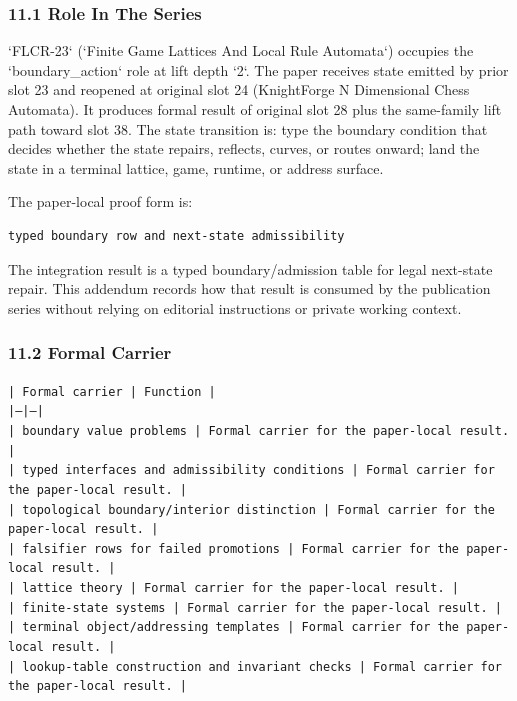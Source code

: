 \documentclass[11pt]{article}
\begin{document}
\subsubsection*{11.1 Role In The Series}

`FLCR-23` (`Finite Game Lattices And Local Rule Automata`) occupies the `boundary\_action` role at lift depth `2`.
The paper receives state emitted by prior slot 23 and reopened at original slot 24 (KnightForge N Dimensional Chess Automata). It produces formal result of original slot 28 plus the same-family lift path toward slot 38. The state transition is:
type the boundary condition that decides whether the state repairs, reflects, curves, or routes onward; land the state in a terminal lattice, game, runtime, or address surface.

The paper-local proof form is:

\begin{verbatim}
typed boundary row and next-state admissibility
\end{verbatim}

The integration result is a typed boundary/admission table for legal next-state repair. This addendum records how that result is
consumed by the publication series without relying on editorial instructions or
private working context.

\subsubsection*{11.2 Formal Carrier}

\noindent\texttt{| Formal carrier | Function |}\\
\noindent\texttt{|---|---|}\\
\noindent\texttt{| boundary value problems | Formal carrier for the paper-local result. |}\\
\noindent\texttt{| typed interfaces and admissibility conditions | Formal carrier for the paper-local result. |}\\
\noindent\texttt{| topological boundary/interior distinction | Formal carrier for the paper-local result. |}\\
\noindent\texttt{| falsifier rows for failed promotions | Formal carrier for the paper-local result. |}\\
\noindent\texttt{| lattice theory | Formal carrier for the paper-local result. |}\\
\noindent\texttt{| finite-state systems | Formal carrier for the paper-local result. |}\\
\noindent\texttt{| terminal object/addressing templates | Formal carrier for the paper-local result. |}\\
\noindent\texttt{| lookup-table construction and invariant checks | Formal carrier for the paper-local result. |}\\
\end{document}
